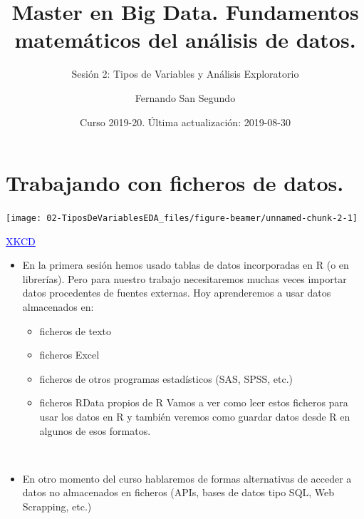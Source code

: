 \documentclass[
  9pt,
  ignorenonframetext,
]{beamer}
\title{Master en Big Data. Fundamentos matemáticos del análisis de datos.}
\subtitle{Sesión 2: Tipos de Variables y Análisis Exploratorio}
\author{Fernando San Segundo}
\date{Curso 2019-20. Última actualización: 2019-08-30}
\providecommand{\tightlist}{%
  \setlength{\itemsep}{0pt}\setlength{\parskip}{0pt}}
\begin{document}
\frame{\titlepage}

\begin{frame}
  \tableofcontents[hideallsubsections]
\end{frame}
\hypertarget{trabajando-con-ficheros-de-datos.}{%
\section{Trabajando con ficheros de
datos.}\label{trabajando-con-ficheros-de-datos.}}

\begin{frame}

\begin{center}\texttt{[image: 02-TiposDeVariablesEDA\_files/figure-beamer/unnamed-chunk-2-1]} \end{center}

\href{https://xkcd.com/1301/}{\textcolor{blue}{\underline{XKCD}}}

\end{frame}

\begin{frame}

\begin{itemize}
\tightlist
\item
  En la primera sesión hemos usado tablas de datos incorporadas en R (o
  en librerías). Pero para nuestro trabajo necesitaremos muchas veces
  importar datos procedentes de fuentes externas. Hoy aprenderemos a
  usar datos almacenados en:

  \begin{itemize}
  \tightlist
  \item
    ficheros de texto
  \item
    ficheros Excel
  \item
    ficheros de otros programas estadísticos (SAS, SPSS, etc.)
  \item
    ficheros RData propios de R Vamos a ver como leer estos ficheros
    para usar los datos en R y también veremos como guardar datos desde
    R en algunos de esos formatos.
  \end{itemize}
\end{itemize}

\({ }\)

\begin{itemize}
\tightlist
\item
  En otro momento del curso hablaremos de formas alternativas de acceder
  a datos no almacenados en ficheros (APIs, bases de datos tipo SQL, Web
  Scrapping, etc.)
\end{itemize}

\end{frame}
\end{document}
